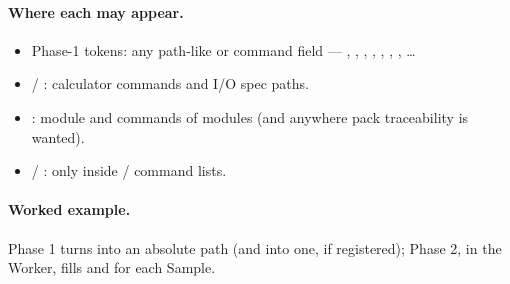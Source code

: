 \paragraph{Where each may appear.}

\begin{itemize}
  \item Phase-1 tokens: any path-like or command field --- ,
        , , , ,
        , , \ldots
  \item {} / : calculator  commands and
        I/O spec paths.
  \item {}: module  and commands of 
        modules (and anywhere pack traceability is wanted).
  \item {} / : only inside
        / command lists.
\end{itemize}

\paragraph{Worked example.}


Phase 1 turns  into an absolute path (and  into
one, if registered); Phase 2, in the Worker, fills  and 
for each Sample.
